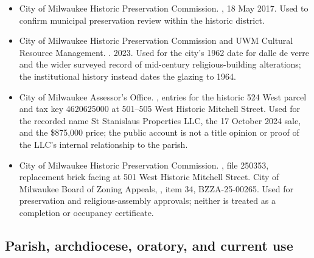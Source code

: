 \begin{itemize}[leftmargin=1.35em,itemsep=0.2em,topsep=0.2em]
\item City of Milwaukee Historic Preservation Commission. , 18 May 2017. Used to confirm municipal preservation review within the historic district.
\item City of Milwaukee Historic Preservation Commission and UWM Cultural Resource Management. . 2023. Used for the city's 1962 date for dalle de verre and the wider surveyed record of mid-century religious-building alterations; the institutional history instead dates the glazing to 1964.
\item City of Milwaukee Assessor's Office. , entries for the historic 524 West parcel and tax key 4620625000 at 501--505 West Historic Mitchell Street. Used for the recorded name St Stanislaus Properties LLC, the 17 October 2024 sale, and the \$875,000 price; the public account is not a title opinion or proof of the LLC's internal relationship to the parish.
\item City of Milwaukee Historic Preservation Commission. , file 250353, replacement brick facing at 501 West Historic Mitchell Street. City of Milwaukee Board of Zoning Appeals, , item 34, BZZA-25-00265. Used for preservation and religious-assembly approvals; neither is treated as a completion or occupancy certificate.
\end{itemize}

\subsection{Parish, archdiocese, oratory, and current use}

